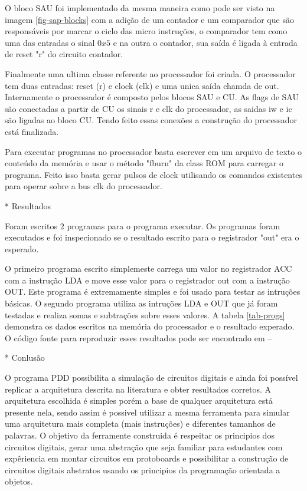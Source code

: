 O bloco SAU foi implementado da mesma maneira como pode ser visto na imagem \ref{fig-sap-blocks} com a adição de um contador e um comparador que são responsáveis por marcar o ciclo das micro instruções, o comparador tem como uma das entradas o sinal $0x5$ e na outra o contador, sua saída é ligada à entrada de reset "r" do circuito contador.

Finalmente uma ultima classe referente ao processador foi criada. O processador tem duas entradas: reset (r) e clock (clk) e uma unica saída chamda de out. Internamente o processador é composto pelos blocos SAU e CU. As flags de SAU são conectadas a partir de CU os sinais r e clk do processador, as saidas iw e ic são ligadas ao bloco CU. Tendo feito essas conexões a construção do processador está finalizada.

Para executar programas no processador basta escrever em um arquivo de texto o conteúdo da memória e usar o método "fburn" da class ROM para carregar o programa. Feito isso basta gerar pulsos de clock utilisando os comandos existentes para operar sobre a bus clk do processador.

* Resultados

Foram escritos 2 programas para o programa executar. Os programas foram executados e foi inspecionado se o resultado escrito para o registrador "out" era o esperado.

O primeiro programa escrito simplemeste carrega um valor no registrador ACC com a instrução LDA e move esse valor para o registrador out com a instrução OUT. Este programa é extremamente simples e foi usado para testar as intruções básicas. O segundo programa utiliza as intruções LDA e OUT que já foram testadas e realiza somas e subtrações sobre esses valores. A tabela \ref{tab-progs} demonstra os dados escritos na memória do processador e o resultado experado. O código fonte para reproduzir esses resultados pode ser encontrado em --

* Conlusão 

O programa PDD possibilita a simulação de circuitos digitais e ainda foi possível replicar a arquitetura descrita na literatura e obter resultados corretos. A arquitetura escolhida é simples porém a base de qualquer arquitetura está presente nela, sendo assim é possivel utilizar a mesma ferramenta para simular uma arquitetura mais completa (mais instruções) e diferentes tamanhos de palavras. O objetivo da ferramente construida é respeitar os principios dos circuitos digitais, gerar uma abstração que seja familiar para estudantes com expêriencia em montar circuitos em protoboards e possibilitar a construção de circuitos digitais abstratos usando os principios da programação orientada a objetos.

